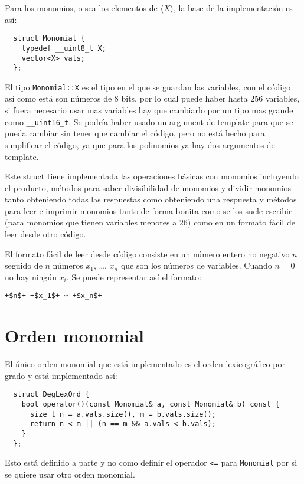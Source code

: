 \documentclass{report}
\theoremstyle{customstyle}
\theoremstyle{factstyle}
\begin{document}
Para los monomios, o sea los elementos de $⟨X⟩$, la base de la implementación es así:

\begin{verbatim}
  struct Monomial {
    typedef __uint8_t X;
    vector<X> vals;
  };
\end{verbatim}

El tipo \texttt{Monomial::X} es el tipo en el que se guardan las variables, con el código así como está son números de 8 bits, por lo cual puede haber hasta 256 variables, si fuera necesario usar mas variables hay que cambiarlo por un tipo mas grande como \texttt{\_\_uint16\_t}. Se podría haber usado un argument de template para que se pueda cambiar sin tener que cambiar el código, pero no está hecho para simplificar el código, ya que para los polinomios ya hay dos argumentos de template.

Este struct tiene implementada las operaciones básicas con monomios incluyendo el producto, métodos para saber divisibilidad de monomios y dividir monomios tanto obteniendo todas las respuestas como obteniendo una respuesta y métodos para leer e imprimir monomios tanto de forma bonita como se los suele escribir (para monomios que tienen variables menores a 26) como en un formato fácil de leer desde otro código.

El formato fácil de leer desde código consiste en un número entero no negativo $n$ seguido de $n$ números $x_1$, …, $x_n$ que son los números de variables. Cuando $n = 0$ no hay ningún $x_i$. Se puede representar así el formato:

\begin{lstlisting}[escapechar=+]
  +$n$+ +$x_1$+ ⋯ +$x_n$+
\end{lstlisting}

\section{Orden monomial}

El único orden monomial que está implementado es el orden lexicográfico por grado y está implementado así:

\begin{verbatim}
  struct DegLexOrd {
    bool operator()(const Monomial& a, const Monomial& b) const {
      size_t n = a.vals.size(), m = b.vals.size();
      return n < m || (n == m && a.vals < b.vals);
    }
  };
\end{verbatim}

Esto está definido a parte y no como definir el operador \texttt{<=} para \texttt{Monomial} por si se quiere usar otro orden monomial.
\end{document}
